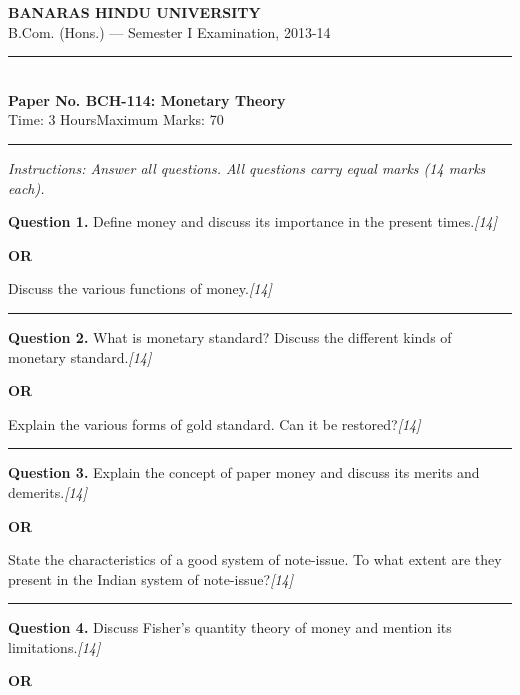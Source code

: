 \documentclass[11pt,a4paper]{article}
\newcommand{\pts}[1]{\hfill   \textit{[#1]}}
\begin{document}
\begin{center}
  {\large\bfseries BANARAS HINDU UNIVERSITY}\\[2pt]
  {\normalsize B.Com. (Hons.) --- Semester I Examination, 2013-14}\\[6pt]
  \rule{0.8\linewidth}{0.5pt}\\[6pt]
  {\large\bfseries Paper No. BCH-114: Monetary Theory}\\[4pt]
  {\normalsize Time: 3 Hours\hfill Maximum Marks: 70}
\end{center}

\rule{\linewidth}{0.4pt}

\smallskip



\noindent   \textit{Instructions: Answer all questions. All questions carry equal marks (14 marks each).}

\bigskip




\noindent   \textbf{Question 1.}
Define money and discuss its importance in the present times.\pts{14}

\centerline{   \textbf{OR}}

Discuss the various functions of money.\pts{14}

\medskip\rule{\linewidth}{0.2pt}




\noindent   \textbf{Question 2.}
What is monetary standard? Discuss the different kinds of monetary standard.\pts{14}

\centerline{   \textbf{OR}}

Explain the various forms of gold standard. Can it be restored?\pts{14}

\medskip\rule{\linewidth}{0.2pt}




\noindent   \textbf{Question 3.}
Explain the concept of paper money and discuss its merits and demerits.\pts{14}

\centerline{   \textbf{OR}}

State the characteristics of a good system of note-issue. To what extent are they present in the Indian system of note-issue?\pts{14}

\medskip\rule{\linewidth}{0.2pt}




\noindent   \textbf{Question 4.}
Discuss Fisher's quantity theory of money and mention its limitations.\pts{14}

\centerline{   \textbf{OR}}
\end{document}
